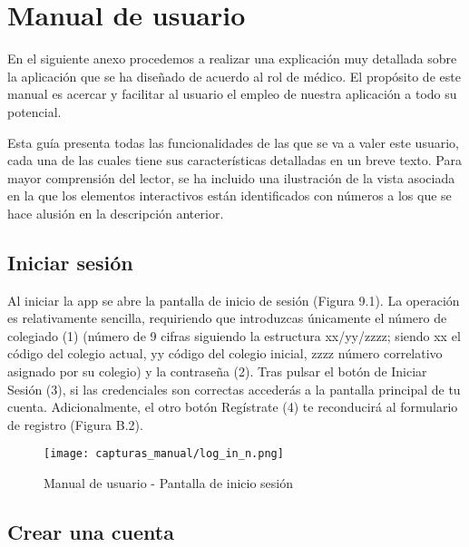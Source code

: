 \documentclass[11pt,spanish,
		listoftables,listoffigures]
		{tfgplantilla}
\begin{document}
\section{Manual de usuario}

En el siguiente anexo procedemos a realizar una explicación muy detallada sobre la aplicación que se ha diseñado de acuerdo al rol de médico. El propósito de este manual es  acercar y facilitar al usuario el empleo de nuestra aplicación a todo su potencial. 

Esta guía presenta todas las funcionalidades de las que se va a valer este usuario, cada una de las cuales tiene sus características detalladas en un breve texto. Para mayor comprensión del lector, se ha incluido una ilustración de la vista asociada en la que los elementos interactivos están identificados con números a los que se hace alusión en la descripción anterior.

\subsection {Iniciar sesión}


Al iniciar la app se abre la pantalla de inicio de sesión (Figura 9.1). La operación es relativamente sencilla, requiriendo que introduzcas únicamente el número de colegiado (1) (número de 9 cifras siguiendo la estructura xx/yy/zzzz; siendo xx el código del colegio actual, yy código del colegio inicial, zzzz número correlativo asignado por su colegio) y la contraseña (2). Tras pulsar el botón de \textquotedbl Iniciar Sesión\textquotedbl{} (3), si las credenciales son correctas accederás a la pantalla principal de tu cuenta. Adicionalmente, el otro botón \textquotedbl Regístrate\textquotedbl{} (4) te reconducirá al formulario de registro (Figura B.2).

\begin{figure}[H]
\centering
\texttt{[image: capturas\_manual/log\_in\_n.png]}
\caption{Manual de usuario - Pantalla de inicio sesión}	
\end{figure}

\subsection {Crear una cuenta}
\end{document}
